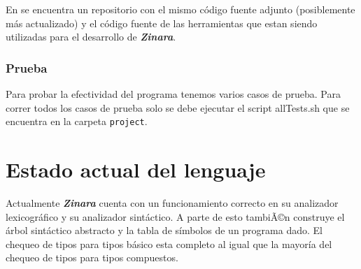 \documentclass[12pt, spanish]{report}
\begin{document}
En \cite{github} se encuentra un repositorio con el mismo c\'odigo
fuente adjunto (posiblemente m\'as actualizado) y el c\'odigo fuente de
las herramientas que estan siendo utilizadas para el desarrollo de
\emph{\textbf{Zinara}}.

\subsection{Prueba}
\label{sec:pruebas}
Para probar la efectividad del programa tenemos varios casos de
prueba. Para correr todos los casos de prueba solo se debe ejecutar el
script allTests.sh que se encuentra en la carpeta \texttt{project}.

\chapter{Estado actual del lenguaje}
\label{chap:estado}

Actualmente \emph{\textbf{Zinara}} cuenta con un funcionamiento
correcto en su analizador lexicogr\'afico y su analizador sint\'actico. A
parte de esto tambiÃ©n construye el \'arbol sint\'actico abstracto y la
tabla de s\'imbolos de un programa dado. El chequeo de tipos para tipos
b\'asico esta completo al igual que la mayor\'ia del chequeo de tipos
para tipos compuestos.



\end{document}
